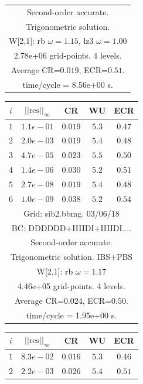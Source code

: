 \begin{table}[hbt]
\begin{center}
{\begin{tabular}{|c|c|c|c|c|}
\multicolumn{5}{|c|}{Second-order accurate.}  \\
\multicolumn{5}{|c|}{Trigonometric solution.}  \\
\multicolumn{5}{|c|}{W[2,1]: rb $\omega=1.15$, lz3 $\omega=1.00$}  \\
\multicolumn{5}{|c|}{2.78e+06 grid-points. 4 levels.}  \\
\multicolumn{5}{|c|}{Average CR=$0.019$, ECR=$0.51$.}  \\
\multicolumn{5}{|c|}{time/cycle = 8.56e+00 s.}  \\
\hline 
\end{tabular}
\begin{tabular}{|c|c|c|c|c|} \hline 
 $i$   & $\vert\vert\mbox{res}\vert\vert_\infty$  &  CR     &  WU    & ECR  \\   \hline 
 $ 1$  & $ 1.1e-01$ & $0.019$ & $ 5.3$ & $0.47$ \\ 
 $ 2$  & $ 2.0e-03$ & $0.019$ & $ 5.4$ & $0.48$ \\ 
 $ 3$  & $ 4.7e-05$ & $0.023$ & $ 5.5$ & $0.50$ \\ 
 $ 4$  & $ 1.4e-06$ & $0.030$ & $ 5.2$ & $0.51$ \\ 
 $ 5$  & $ 2.7e-08$ & $0.019$ & $ 5.4$ & $0.48$ \\ 
 $ 6$  & $ 1.0e-09$ & $0.038$ & $ 5.2$ & $0.54$ \\ 
\hline 
\multicolumn{5}{|c|}{Grid: sib2.bbmg. 03/06/18}  \\
\multicolumn{5}{|c|}{BC: DDDDDD+IIIIDI+IIIIDI....}  \\
\multicolumn{5}{|c|}{Second-order accurate.}  \\
\multicolumn{5}{|c|}{Trigonometric solution. IBS+PBS}  \\
\multicolumn{5}{|c|}{W[2,1]: rb $\omega=1.17$}  \\
\multicolumn{5}{|c|}{4.46e+05 grid-points. 4 levels.}  \\
\multicolumn{5}{|c|}{Average CR=$0.024$, ECR=$0.50$.}  \\
\multicolumn{5}{|c|}{time/cycle = 1.95e+00 s.}  \\
\hline 
\end{tabular}
\begin{tabular}{|c|c|c|c|c|} \hline 
 $i$   & $\vert\vert\mbox{res}\vert\vert_\infty$  &  CR     &  WU    & ECR  \\   \hline 
 $ 1$  & $ 8.3e-02$ & $0.016$ & $ 5.3$ & $0.46$ \\ 
 $ 2$  & $ 2.2e-03$ & $0.026$ & $ 5.4$ & $0.51$ \\ 

\end{tabular}}
\end{center}
\end{table}
